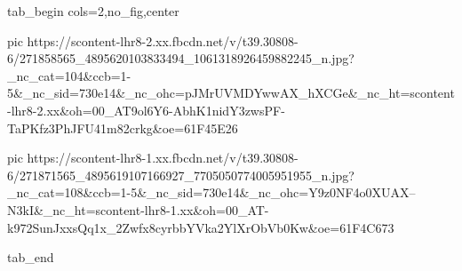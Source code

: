  
 
 
 
 


\ifcmt
  tab_begin cols=2,no_fig,center

     pic https://scontent-lhr8-2.xx.fbcdn.net/v/t39.30808-6/271858565_4895620103833494_1061318926459882245_n.jpg?_nc_cat=104&ccb=1-5&_nc_sid=730e14&_nc_ohc=pJMrUVMDYwwAX_hXCGe&_nc_ht=scontent-lhr8-2.xx&oh=00_AT9ol6Y6-AbhK1nidY3zwsPF-TaPKfz3PhJFU41m82crkg&oe=61F45E26

     pic https://scontent-lhr8-1.xx.fbcdn.net/v/t39.30808-6/271871565_4895619107166927_7705050774005951955_n.jpg?_nc_cat=108&ccb=1-5&_nc_sid=730e14&_nc_ohc=Y9z0NF4o0XUAX--N3kI&_nc_ht=scontent-lhr8-1.xx&oh=00_AT-k972SunJxxsQq1x_2Zwfx8cyrbbYVka2YlXrObVb0Kw&oe=61F4C673

  tab_end
\fi
